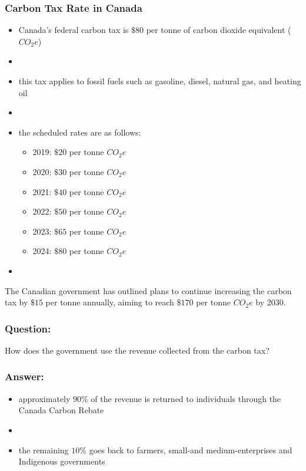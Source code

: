 \documentclass[blue]{beamer}
\begin{document}
      \begin{frame} \frametitle{Carbon Tax Rate in Canada}
\label{GHG comparison}

\begin{itemize}
\item Canada's federal carbon tax is $\$ 80$ per tonne of carbon dioxide equivalent ($CO_{2}e$)
\item[]
\item this tax applies to fossil fuels such as gasoline, diesel, natural gas, and heating oil
\item[]
\item the scheduled rates are as follows:
\begin{itemize}
\item 2019: $\$ 20$ per tonne $CO_{2}e$
\item 2020: $\$ 30$ per tonne $CO_{2}e$
\item 2021: $\$ 40$ per tonne $CO_{2}e$
\item 2022: $\$ 50$ per tonne $CO_{2}e$
\item 2023: $\$ 65$ per tonne $CO_{2}e$
\item 2024: $\$ 80$ per tonne $CO_{2}e$

\end{itemize}
\item[]
\end{itemize}
The Canadian government has outlined plans to continue increasing the carbon tax by  $\$15$ per tonne annually, aiming to reach  $\$170$ per tonne $CO_{2}e$ by 2030.
 \end{frame}







      \begin{frame} \frametitle{Question:}
\label{GHG comparison}


How does the government use the revenue collected from the carbon tax?
 \end{frame}


      \begin{frame} \frametitle{Answer:}
\label{GHG comparison}
\begin{itemize}


\item approximately $90\%$ of the revenue is returned to individuals through the Canada Carbon Rebate
\item[]
\item the remaining $10\%$ goes back to farmers,  small-and medium-enterprises and Indigenous governments
\end{itemize}
 \end{frame}
\end{document}
